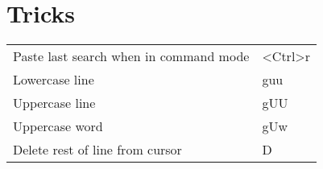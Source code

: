\documentclass[a4paper]{report}
\def \tablewidth {10cm}
\begin{document}
\section{Tricks}
\begin{tabularx}{\tablewidth}{| X | l |}
  \hline
  Paste last search when in command mode & \textless Ctrl\textgreater r \\
  Lowercase line & guu \\
  Uppercase line & gUU \\
  Uppercase word & gUw \\
  Delete rest of line from cursor & D \\
  \hline
\end{tabularx}
\end{document}
